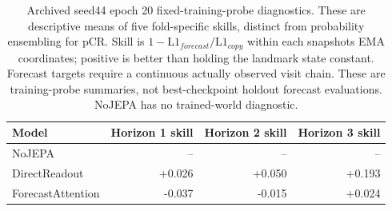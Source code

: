 \begin{table}[t]
\centering
\small
\caption{Archived seed44 epoch 20 fixed-training-probe diagnostics. These are descriptive means of five fold-specific skills, distinct from probability ensembling for pCR. Skill is $1-\mathrm{L1}_{forecast}/\mathrm{L1}_{copy}$ within each snapshot\textquotesingle s EMA coordinates; positive is better than holding the landmark state constant. Forecast targets require a continuous actually observed visit chain. These are training-probe summaries, not best-checkpoint holdout forecast evaluations. NoJEPA has no trained-world diagnostic.}
\label{tab:worldprobe}
\begin{tabular}{lrrr}
\toprule
Model & Horizon 1 skill & Horizon 2 skill & Horizon 3 skill \\
\midrule
NoJEPA & -- & -- & -- \\
DirectReadout & +0.026 & +0.050 & +0.193 \\
ForecastAttention & -0.037 & -0.015 & +0.024 \\
\bottomrule
\end{tabular}
\end{table}
